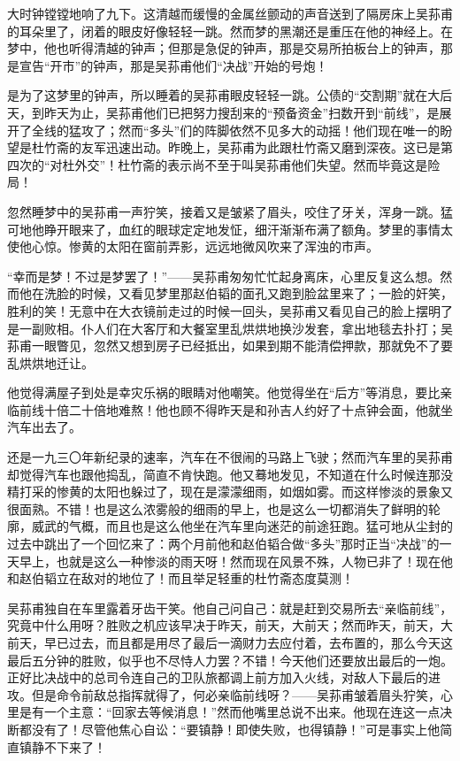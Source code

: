 \par 大时钟镗镗地响了九下。这清越而缓慢的金属丝颤动的声音送到了隔房床上吴荪甫的耳朵里了，闭着的眼皮好像轻轻一跳。然而梦的黑潮还是重压在他的神经上。在梦中，他也听得清越的钟声；但那是急促的钟声，那是交易所拍板台上的钟声，那是宣告“开市”的钟声，那是吴荪甫他们“决战”开始的号炮！
\par 是为了这梦里的钟声，所以睡着的吴荪甫眼皮轻轻一跳。公债的“交割期”就在大后天，到昨天为止，吴荪甫他们已把努力搜刮来的“预备资金”扫数开到“前线”，是展开了全线的猛攻了；然而“多头”们的阵脚依然不见多大的动摇！他们现在唯一的盼望是杜竹斋的友军迅速出动。昨晚上，吴荪甫为此跟杜竹斋又磨到深夜。这已是第四次的“对杜外交”！杜竹斋的表示尚不至于叫吴荪甫他们失望。然而毕竟这是险局！
\par 忽然睡梦中的吴荪甫一声狞笑，接着又是皱紧了眉头，咬住了牙关，浑身一跳。猛可地他睁开眼来了，血红的眼球定定地发怔，细汗渐渐布满了额角。梦里的事情太使他心惊。惨黄的太阳在窗前弄影，远远地微风吹来了浑浊的市声。
\par “幸而是梦！不过是梦罢了！”——吴荪甫匆匆忙忙起身离床，心里反复这么想。然而他在洗脸的时候，又看见梦里那赵伯韬的面孔又跑到脸盆里来了；一脸的奸笑，胜利的笑！无意中在大衣镜前走过的时候一回头，吴荪甫又看见自己的脸上摆明了是一副败相。仆人们在大客厅和大餐室里乱烘烘地换沙发套，拿出地毯去扑打；吴荪甫一眼瞥见，忽然又想到房子已经抵出，如果到期不能清偿押款，那就免不了要乱烘烘地迁让。
\par 他觉得满屋子到处是幸灾乐祸的眼睛对他嘲笑。他觉得坐在“后方”等消息，要比亲临前线十倍二十倍地难熬！他也顾不得昨天是和孙吉人约好了十点钟会面，他就坐汽车出去了。
\par 还是一九三〇年新纪录的速率，汽车在不很闹的马路上飞驶；然而汽车里的吴荪甫却觉得汽车也跟他捣乱，简直不肯快跑。他又蓦地发见，不知道在什么时候连那没精打采的惨黄的太阳也躲过了，现在是濛濛细雨，如烟如雾。而这样惨淡的景象又很面熟。不错！也是这么浓雾般的细雨的早上，也是这么一切都消失了鲜明的轮廓，威武的气概，而且也是这么他坐在汽车里向迷茫的前途狂跑。猛可地从尘封的过去中跳出了一个回忆来了：两个月前他和赵伯韬合做“多头”那时正当“决战”的一天早上，也就是这么一种惨淡的雨天呀！然而现在风景不殊，人物已非了！现在他和赵伯韬立在敌对的地位了！而且举足轻重的杜竹斋态度莫测！
\par 吴荪甫独自在车里露着牙齿干笑。他自己问自己：就是赶到交易所去“亲临前线”，究竟中什么用呀？胜败之机应该早决于昨天，前天，大前天；然而昨天，前天，大前天，早已过去，而且都是用尽了最后一滴财力去应付着，去布置的，那么今天这最后五分钟的胜败，似乎也不尽恃人力罢？不错！今天他们还要放出最后的一炮。正好比决战中的总司令连自己的卫队旅都调上前方加入火线，对敌人下最后的进攻。但是命令前敌总指挥就得了，何必亲临前线呀？——吴荪甫皱着眉头狞笑，心里是有一个主意：“回家去等候消息！”然而他嘴里总说不出来。他现在连这一点决断都没有了！尽管他焦心自讼：“要镇静！即使失败，也得镇静！”可是事实上他简直镇静不下来了！
